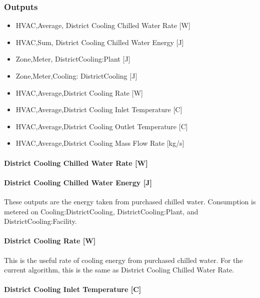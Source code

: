 \subsubsection{Outputs}\label{outputs-14-003}

\begin{itemize}
    \item
    HVAC,Average, District Cooling Chilled Water Rate {[}W{]}
    \item
    HVAC,Sum, District Cooling Chilled Water Energy {[}J{]}
    \item
    Zone,Meter, DistrictCooling:Plant {[}J{]}
    \item
    Zone,Meter,Cooling: DistrictCooling {[}J{]}
    \item
    HVAC,Average,District Cooling Rate {[}W{]}
    \item
    HVAC,Average,District Cooling Inlet Temperature {[}C{]}
    \item
    HVAC,Average,District Cooling Outlet Temperature {[}C{]}
    \item
    HVAC,Average,District Cooling Mass Flow Rate {[}kg/s{]}
\end{itemize}

\paragraph{District Cooling Chilled Water Rate {[}W{]}}\label{district-cooling-chilled-water-rate-w}

\paragraph{District Cooling Chilled Water Energy {[}J{]}}\label{district-cooling-chilled-water-energy-j}

These outputs are the energy taken from purchased chilled water. Consumption is metered on Cooling:DistrictCooling, DistrictCooling:Plant, and DistrictCooling:Facility.

\paragraph{District Cooling Rate {[}W{]}}\label{district-cooling-rate-w}

This is the useful rate of cooling energy from purchased chilled water. For the current algorithm, this is the same as District Cooling Chilled Water Rate.

\paragraph{District Cooling Inlet Temperature {[}C{]}}\label{district-cooling-inlet-temperature-c}

